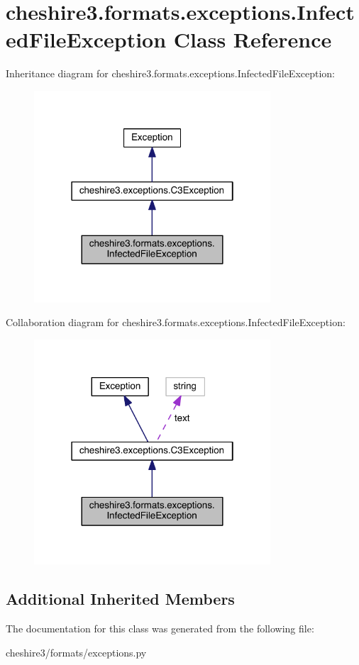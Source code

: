 \hypertarget{classcheshire3_1_1formats_1_1exceptions_1_1_infected_file_exception}{\section{cheshire3.\-formats.\-exceptions.\-Infected\-File\-Exception Class Reference}
\label{classcheshire3_1_1formats_1_1exceptions_1_1_infected_file_exception}
}


Inheritance diagram for cheshire3.\-formats.\-exceptions.\-Infected\-File\-Exception\-:
\nopagebreak
\begin{figure}[H]
\begin{center}
\leavevmode
\includegraphics[width=250pt]{classcheshire3_1_1formats_1_1exceptions_1_1_infected_file_exception__inherit__graph}
\end{center}
\end{figure}


Collaboration diagram for cheshire3.\-formats.\-exceptions.\-Infected\-File\-Exception\-:
\nopagebreak
\begin{figure}[H]
\begin{center}
\leavevmode
\includegraphics[width=250pt]{classcheshire3_1_1formats_1_1exceptions_1_1_infected_file_exception__coll__graph}
\end{center}
\end{figure}
\subsection*{Additional Inherited Members}


The documentation for this class was generated from the following file\-:\begin{DoxyCompactItemize}
\item 
cheshire3/formats/exceptions.\-py\end{DoxyCompactItemize}
